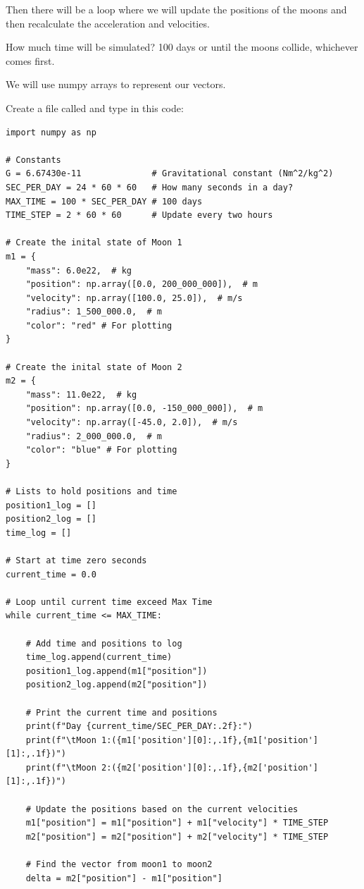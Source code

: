 Then there will be a loop where we will update the positions of the moons and then recalculate the 
acceleration and velocities.    

How much time will be simulated?  100 days or until the moons collide,  whichever
comes first.

We will use numpy arrays to represent our vectors.

Create a file called   and type in this code:

\begin{verbatim}
import numpy as np

# Constants
G = 6.67430e-11              # Gravitational constant (Nm^2/kg^2)
SEC_PER_DAY = 24 * 60 * 60   # How many seconds in a day?
MAX_TIME = 100 * SEC_PER_DAY # 100 days
TIME_STEP = 2 * 60 * 60      # Update every two hours

# Create the inital state of Moon 1
m1 = {
    "mass": 6.0e22,  # kg
    "position": np.array([0.0, 200_000_000]),  # m
    "velocity": np.array([100.0, 25.0]),  # m/s
    "radius": 1_500_000.0,  # m
    "color": "red" # For plotting
}

# Create the inital state of Moon 2
m2 = {
    "mass": 11.0e22,  # kg
    "position": np.array([0.0, -150_000_000]),  # m
    "velocity": np.array([-45.0, 2.0]),  # m/s
    "radius": 2_000_000.0,  # m
    "color": "blue" # For plotting
}  

# Lists to hold positions and time
position1_log = []
position2_log = []
time_log = []

# Start at time zero seconds
current_time = 0.0

# Loop until current time exceed Max Time
while current_time <= MAX_TIME:

    # Add time and positions to log
    time_log.append(current_time)
    position1_log.append(m1["position"])
    position2_log.append(m2["position"])
    
    # Print the current time and positions
    print(f"Day {current_time/SEC_PER_DAY:.2f}:")
    print(f"\tMoon 1:({m1['position'][0]:,.1f},{m1['position'][1]:,.1f})")
    print(f"\tMoon 2:({m2['position'][0]:,.1f},{m2['position'][1]:,.1f})")

    # Update the positions based on the current velocities
    m1["position"] = m1["position"] + m1["velocity"] * TIME_STEP
    m2["position"] = m2["position"] + m2["velocity"] * TIME_STEP

    # Find the vector from moon1 to moon2
    delta = m2["position"] - m1["position"]


\end{verbatim}
